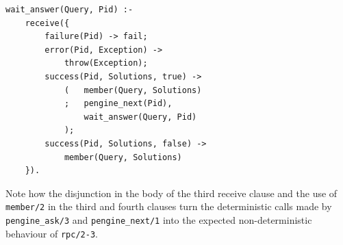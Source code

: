 \documentclass{tlp}
\begin{document}
\begin{lstlisting}
wait_answer(Query, Pid) :-
    receive({
        failure(Pid) -> fail;            
        error(Pid, Exception) -> 
            throw(Exception);                  
        success(Pid, Solutions, true) -> 
            (   member(Query, Solutions)
            ;   pengine_next(Pid), 
                wait_answer(Query, Pid)
            );
        success(Pid, Solutions, false) -> 
            member(Query, Solutions)
    }).
\end{lstlisting}

\noindent Note how the disjunction in the body of the third receive clause and the use of \texttt{member/2} in the third and fourth clauses turn the deterministic calls made by \texttt{pengine\_ask/3} and \texttt{pengine\_next/1} into the expected non-deterministic behaviour of \texttt{rpc/2-3}. 


\end{document}
